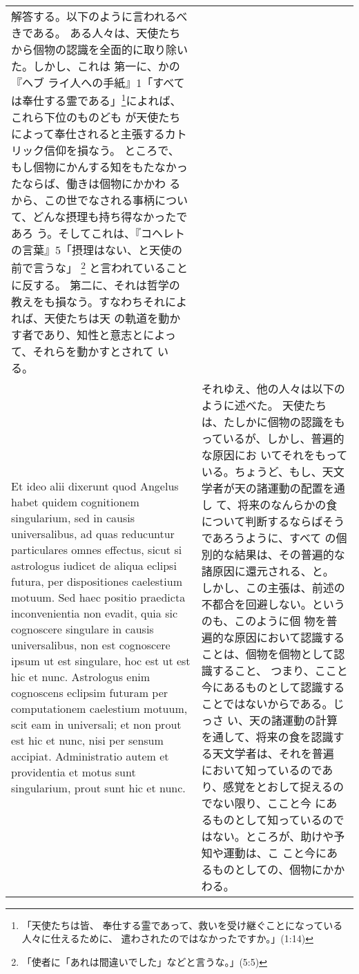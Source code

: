 \documentclass[10pt]{jsarticle} %
\begin{document}
\begin{longtable}{p{21em}p{21em}}
 解答する。以下のように言われるべきである。
 ある人々は、天使たちから個物の認識を全面的に取り除いた。しかし、これは
 第一に、かの『ヘブ
 ライ人への手紙』1「すべては奉仕する霊である」\footnote{「天使たちは皆、
 奉仕する霊であって、救いを受け継ぐことになっている人々に仕えるために、
 遣わされたのではなかったですか。」(1:14)}によれば、これら下位のものども
 が天使たちによって奉仕されると主張するカトリック信仰を損なう。
 ところで、もし個物にかんする知をもたなかったならば、働きは個物にかかわ
 るから、この世でなされる事柄について、どんな摂理も持ち得なかったであろ
 う。そしてこれは、『コヘレトの言葉』5「摂理はない、と天使の前で言うな」
 \footnote{「使者に「あれは間違いでした」などと言うな。」(5:5)}
 と言われていることに反する。
 第二に、それは哲学の教えをも損なう。すなわちそれによれば、天使たちは天
 の軌道を動かす者であり、知性と意志とによって、それらを動かすとされて
 いる。
 
\\

Et ideo alii dixerunt quod
Angelus habet quidem cognitionem singularium, sed in causis
universalibus, ad quas reducuntur particulares omnes effectus, sicut si
astrologus iudicet de aliqua eclipsi futura, per dispositiones
caelestium motuum. Sed haec positio praedicta inconvenientia non evadit,
quia sic cognoscere singulare in causis universalibus, non est
cognoscere ipsum ut est singulare, hoc est ut est hic et
nunc. Astrologus enim cognoscens eclipsim futuram per computationem
caelestium motuum, scit eam in universali; et non prout est hic et nunc,
nisi per sensum accipiat. Administratio autem et providentia et motus
sunt singularium, prout sunt hic et nunc. 


&

 それゆえ、他の人々は以下のように述べた。
 天使たちは、たしかに個物の認識をもっているが、しかし、普遍的な原因にお
 いてそれをもっている。ちょうど、もし、天文学者が天の諸運動の配置を通し
 て、将来のなんらかの食について判断するならばそうであろうように、すべて
 の個別的な結果は、その普遍的な諸原因に還元される、と。
 しかし、この主張は、前述の不都合を回避しない。というのも、このように個
 物を普遍的な原因において認識することは、個物を個物として認識すること、
 つまり、ここと今にあるものとして認識することではないからである。じっさ
 い、天の諸運動の計算を通して、将来の食を認識する天文学者は、それを普遍
 において知っているのであり、感覚をとおして捉えるのでない限り、ここと今
 にあるものとして知っているのではない。ところが、助けや予知や運動は、こ
 こと今にあるものとしての、個物にかかわる。

\\


\end{longtable}
\end{document}

